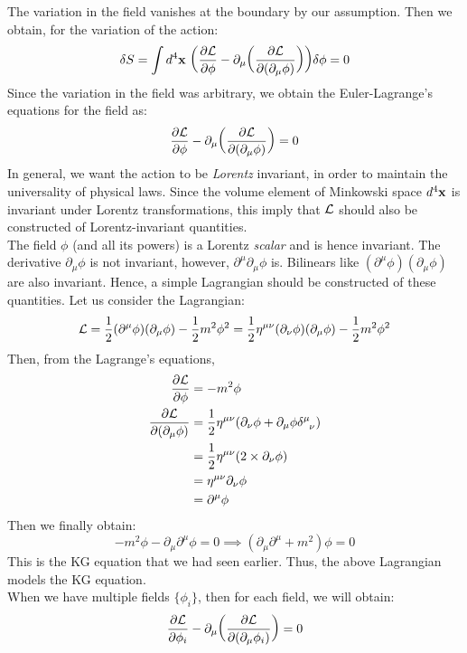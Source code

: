 The variation in the field vanishes at the boundary by our assumption. Then we obtain, for the variation of the action:
$$\delta S =\int d^4\vb{x}\ \qty(\pdv{\mathcal L}{\phi} - \partial_\mu\qty(\pdv{\mathcal L}{(\partial_\mu\phi)}))\delta\phi=0 $$
Since the variation in the field was arbitrary, we obtain the Euler-Lagrange's equations for the field as:
$$\pdv{\mathcal L}{\phi} - \partial_\mu\qty(\pdv{\mathcal L}{(\partial_\mu\phi)})=0$$
In general, we want the action to be \textit{Lorentz} invariant, in order to maintain the universality of physical laws. Since the volume element of Minkowski space $d^4\vb{x}$ is invariant under Lorentz transformations, this imply that $\mathcal L$ should also be constructed of Lorentz-invariant quantities.\\[0.2cm] The field $\phi$ (and all its powers) is a Lorentz \textit{scalar} and is hence invariant. The derivative $\partial_\mu \phi$ is not invariant, however, $\partial^\mu\partial_\mu \phi$ is. Bilinears like $(\partial^\mu\phi)(\partial_\mu\phi)$ are also invariant. Hence, a simple Lagrangian should be constructed of these quantities. Let us consider the Lagrangian:
$$\mathcal L = \frac{1}{2}(\partial^\mu\phi)(\partial_\mu\phi) - \frac{1}{2}m^2\phi^2 = \frac{1}{2}\eta^{\mu\nu}(\partial_\nu \phi) (\partial_\mu\phi)-\frac{1}{2}m^2\phi^2$$
Then, from the Lagrange's equations,
\begin{align*}
    \pdv{\SL}{\phi} &= -m^2\phi \\
    \pdv{\SL}{(\partial_\mu \phi)} &= \frac{1}{2} \eta^{\mu\nu} \qty(\partial_\nu \phi +\partial_\mu\phi \tensor{\delta}{^\mu _\nu})\\
    &=\frac{1}{2} \eta^{\mu\nu} (2\times \partial_\nu \phi)\\
    &=\eta^{\mu\nu}\partial_\nu \phi\\
    &=\partial^\mu\phi
\end{align*}
Then we finally obtain:
$$-m^2\phi - \partial_\mu\partial^\mu\phi=0 \implies (\partial_\mu\partial^\mu+m^2)\phi = 0$$
This is the KG equation that we had seen earlier. Thus, the above Lagrangian models the KG equation.\\[0.2cm]
When we have multiple fields $\{\phi_i\}$, then for each field, we will obtain:
$$\pdv{\mathcal L}{\phi_i} - \partial_\mu\qty(\pdv{\mathcal L}{(\partial_\mu\phi_i)})=0$$
